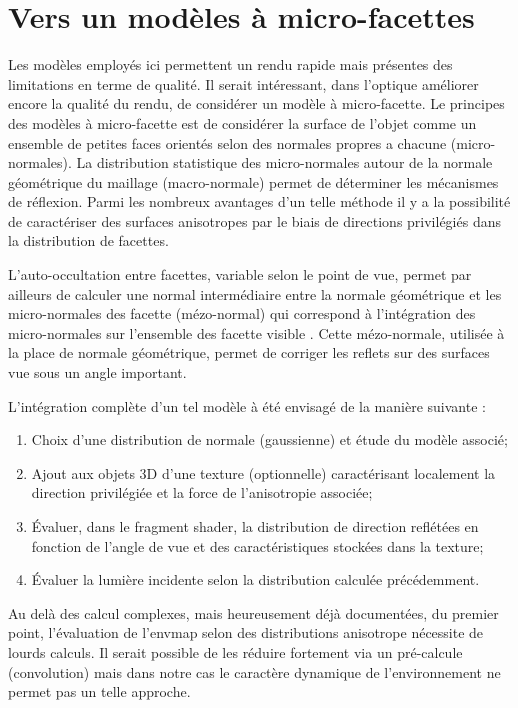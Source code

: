 \documentclass[10pt,a4paper,twoside, twocolumn]{report}
\begin{document}

\section{Vers un modèles à micro-facettes}

Les modèles employés ici permettent un rendu rapide mais présentes des limitations en terme de qualité. Il serait intéressant, dans l'optique améliorer encore la qualité du rendu, de considérer un modèle à micro-facette. 
Le principes des modèles à micro-facette est de considérer la surface de l'objet comme un ensemble de petites faces orientés selon des normales propres a chacune (micro-normales). La distribution statistique des micro-normales autour de la normale géométrique du maillage (macro-normale) permet de déterminer les mécanismes de réflexion. Parmi les nombreux avantages d'un telle méthode il y a la possibilité de caractériser des surfaces anisotropes par le biais de directions privilégiés dans la distribution de facettes.

L'auto-occultation entre facettes, variable selon le point de vue, permet par ailleurs de calculer une normal intermédiaire entre la normale géométrique et les micro-normales des facette (mézo-normal) qui correspond à l’intégration des micro-normales sur l'ensemble des facette visible\cite{Bruneton2010}\cite{Heitz2013} . Cette mézo-normale, utilisée à la place de normale géométrique, permet de corriger les reflets sur des surfaces vue sous un angle important.

L’intégration complète d'un tel modèle à été envisagé de la manière suivante :
\begin{enumerate}
	\item Choix d'une distribution de normale (gaussienne) et étude du modèle associé;
	\item Ajout aux objets 3D d'une texture (optionnelle) caractérisant localement la direction privilégiée et la force de l'anisotropie associée;
	\item Évaluer, dans le fragment shader, la distribution de direction reflétées en fonction de l'angle de vue et des caractéristiques stockées dans la texture;
	\item Évaluer la lumière incidente selon la distribution calculée précédemment.
\end{enumerate}

Au delà des calcul complexes, mais heureusement déjà documentées, du premier point\cite{Heitz2013a}, l'évaluation de l'envmap selon des distributions anisotrope nécessite de lourds calculs.
Il serait possible de les réduire fortement via un pré-calcule (convolution) mais dans notre cas le caractère dynamique de l'environnement ne permet pas un telle approche.
\end{document}
